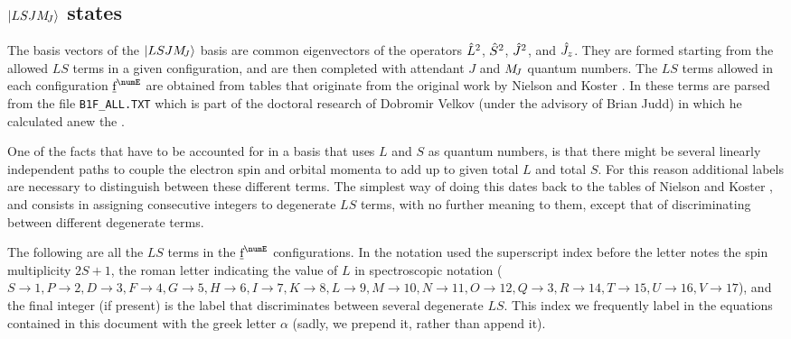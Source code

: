 \documentclass{article}
\newcommand{\codetext}[1]{{\color{BlueViolet} \texttt{#1}}}
\begin{document}
\subsection{$|LSJM_{\!{J}}\rangle$ states}

The basis vectors of the $|LSJM_{\!{J}}\rangle$ basis are common eigenvectors of the operators $\hat{L}^2$, $\hat{S}^2$, $\hat{J}^2$, and $\hat{J}_z$. They are formed starting from the allowed $LS$ terms in a given configuration, and are then completed with attendant $J$ and $M_{\!{J}}$ quantum numbers. The $LS$ terms allowed in each configuration $\forb^\numE$ are obtained from tables that originate from the original work by Nielson and Koster \cite{nielson_spectroscopic_1963}. In \qlanth these terms are parsed from the file \codetext{B1F\_ALL.TXT} which is part of the doctoral research of Dobromir Velkov (under the advisory of Brian Judd) \cite{velkov_multi-electron_2000} in which he calculated anew the \cfps. 

One of the facts that have to be accounted for in a basis that uses $L$ and $S$ as quantum numbers, is that there might be several linearly independent paths to couple the electron spin and orbital momenta to add up to given total $L$ and total $S$. For this reason additional labels are necessary to distinguish between these different terms. The simplest way of doing this dates back to the tables of Nielson and Koster \cite{nielson_spectroscopic_1963}, and consists in assigning consecutive integers to degenerate $LS$ terms, with no further meaning to them, except that of discriminating between different degenerate terms. 
 
The following are all the $LS$ terms in the $\forb^{\numE}$ configurations. In the notation used the superscript index before the letter notes the spin multiplicity $2S+1$, the roman letter indicating the value of $L$ in spectroscopic notation ($S\!\!\rightarrow\!\!1, P\!\!\rightarrow\!\!2, D\!\!\rightarrow\!\!3, F\!\!\rightarrow\!\!4, G\!\!\rightarrow\!\!5, H\!\!\rightarrow\!\!6, I\!\!\rightarrow\!\!7, K\!\!\rightarrow\!\!8, L\!\!\rightarrow\!\!9, M\!\!\rightarrow\!\!10, N\!\!\rightarrow\!\!11, O\!\!\rightarrow\!\!12, Q\!\!\rightarrow\!\!3, R\!\!\rightarrow\!\!14, T\!\!\rightarrow\!\!15, U\!\!\rightarrow\!\!16, V\!\!\rightarrow\!\!17$), and the final integer (if present) is the label that discriminates between several degenerate $LS$. This index we frequently label in the equations contained in this document with the greek letter $\alpha$ (sadly, we prepend it, rather than append it).

   
 
\end{document}
